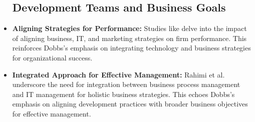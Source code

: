 \documentclass[a4Paper]{article}
\begin{document}
\begin{itemize}
    \subsection{Development Teams and Business Goals}
    \item \textbf{Aligning Strategies for Performance:} Studies like \cite{al2020impact} delve into the impact of aligning business, IT, and marketing strategies on firm performance. This reinforces Dobbs's emphasis on integrating technology and business strategies for organizational success.
    \item \textbf{Integrated Approach for Effective Management:} Rahimi et al. \cite{rahimi2016business} underscore the need for integration between business process management and IT management for holistic business strategies. This echoes Dobbs's emphasis on aligning development practices with broader business objectives for effective management.
\end{itemize}
\end{document}
